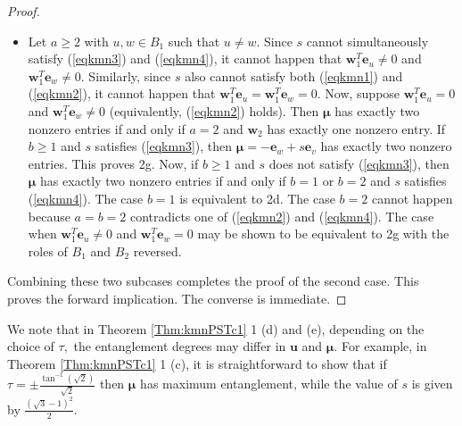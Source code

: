 \documentclass{article}
\numberwithin{equation}{section}
\newcommand{\be}{\mathbf e}
\newcommand{\bu}{\mathbf u}
\newcommand{\bw}{\mathbf w}
\newcommand{\bmu}{{\boldsymbol{\mu}}}
\def\Z{\mathbb{Z}}
\def\ii{\mathrm{i}}
\begin{document}
{\begin{proof}
\begin{itemize}
\begin{itemize}
\item $b=3$ and $s$ satisfies (\ref{eqkmn4}), in which case 
$\bmu=-s(\be_w+\be_x)$ where $B_2=\{v,w,x\}$. As $s$ satisfies (\ref{eqkmn2}) and (\ref{eqkmn4}) and $(a,b)=(1,3)$, we get $\tau\in\big\{\frac{2\pi(3k+\ell)}{3\sqrt{3}}:\ell=1,2\ \text{and}\ k\in\Z\big\}$. In particular, $s=-\ii$ if $\tau=\frac{2\pi(3k+1)}{3\sqrt{3}}$ and $s=\ii$ otherwise. This yields 2f, in which case $s$ is a phase factor.
\end{itemize}
\item Let $a\geq 2$ with $u,w\in B_1$ such that $u\neq w$. Since $s$ cannot simultaneously satisfy (\ref{eqkmn3}) and (\ref{eqkmn4}), it cannot happen that $\bw_1^T\be_u\neq 0$ and $\bw_1^T\be_w\neq 0$. Similarly, since $s$ also cannot satisfy both (\ref{eqkmn1}) and (\ref{eqkmn2}), it cannot happen that $\bw_1^T\be_u=\bw_1^T\be_w=0$. Now, suppose $\bw_1^T\be_u=0$ and $\bw_1^T\be_w\neq 0$ (equivalently, (\ref{eqkmn2}) holds). Then $\bmu$ has exactly two nonzero entries if and only if $a=2$ and $\bw_2$ has exactly one nonzero entry. If $b\geq 1$ and $s$ satisfies (\ref{eqkmn3}), then $\bmu=-\be_w+s\be_v$ has exactly two nonzero entries. This proves 2g. Now, if $b\geq 1$ and $s$ does not satisfy (\ref{eqkmn3}), then $\bmu$ has exactly two nonzero entries if and only if $b=1$ or $b=2$ and $s$ satisfies (\ref{eqkmn4}). The case $b=1$ is equivalent to 2d. The case $b=2$ cannot happen because $a=b=2$ contradicts one of (\ref{eqkmn2}) and (\ref{eqkmn4}).
The case when $\bw_1^T\be_u\neq 0$ and $\bw_1^T\be_w=0$ may be shown to be equivalent to 2g with the roles of $B_1$ and $B_2$ reversed.
\end{itemize}
Combining these two subcases completes the proof of the second case. This proves the forward implication. The converse is immediate.
\end{proof}

We note that in Theorem \ref{Thm:kmnPSTc1} 1 (d) and (e), depending on the choice of $\tau,$ the entanglement degrees may differ in $\bu$ and $\bmu$. For example, in Theorem \ref{Thm:kmnPSTc1} 1 (c), it is straightforward to show that if $\tau = \pm \frac{\tan^{-1}(\sqrt{2})}{\sqrt{2}}$ then $\bmu$ has maximum entanglement, while the value of $s$ is given by $\frac{(\sqrt{3}-1)^2}{2}$. %

}
\end{document}
